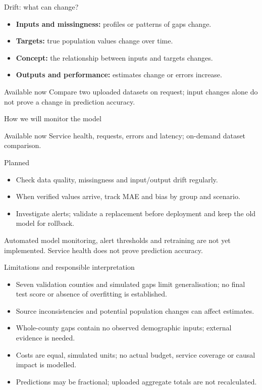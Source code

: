 \documentclass[aspectratio=169,11pt]{beamer}
\begin{document}
\begin{frame}{Drift: what can change?}
  \begin{itemize}
    \item \textbf{Inputs and missingness:} profiles or patterns of gaps change.
    \item \textbf{Targets:} true population values change over time.
    \item \textbf{Concept:} the relationship between inputs and targets changes.
    \item \textbf{Outputs and performance:} estimates change or errors increase.
  \end{itemize}
  \begin{block}{Available now}
    Compare two uploaded datasets on request; input changes alone do not prove
    a change in prediction accuracy.
  \end{block}
\end{frame}

\begin{frame}{How we will monitor the model}
  \begin{block}{Available now}
    Service health, requests, errors and latency; on-demand dataset comparison.
  \end{block}
  \begin{block}{Planned}
    \begin{itemize}
      \item Check data quality, missingness and input/output drift regularly.
      \item When verified values arrive, track MAE and bias by group and scenario.
      \item Investigate alerts; validate a replacement before deployment and
      keep the old model for rollback.
    \end{itemize}
  \end{block}
  \small Automated model monitoring, alert thresholds and retraining are not
  yet implemented. Service health does not prove prediction accuracy.
\end{frame}

\begin{frame}{Limitations and responsible interpretation}
  \begin{itemize}
    \item Seven validation counties and simulated gaps limit generalisation; no final test score
    or absence of overfitting is established.
    \item Source inconsistencies and potential population changes can affect estimates.
    \item Whole-county gaps contain no observed demographic inputs; external evidence is needed.
    \item Costs are equal, simulated units; no actual budget, service coverage or causal impact
    is modelled.
    \item Predictions may be fractional; uploaded aggregate totals are not recalculated.
  \end{itemize}
\end{frame}
\end{document}

